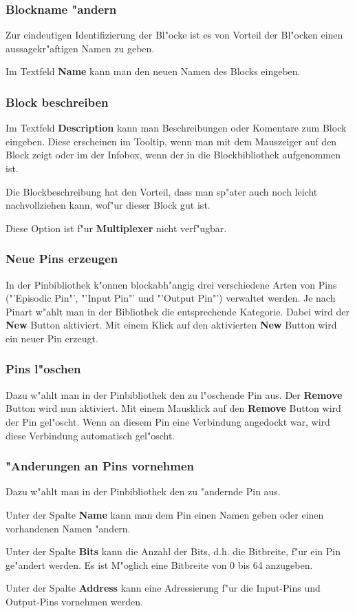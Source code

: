\documentclass[a4paper,titlepage,12pt,ngerman]{scrbook}
\begin{document}
\subsubsection{Blockname "andern}
Zur eindeutigen Identifizierung der Bl"ocke ist es von Vorteil der Bl"ocken einen aussagekr"aftigen Namen zu geben.\par
Im Textfeld {\bf Name} kann man den neuen Namen des Blocks eingeben.
\subsubsection{Block beschreiben}
Im Textfeld {\bf Description} kann man Beschreibungen oder Komentare zum Block eingeben. Diese erscheinen im Tooltip, wenn man mit dem Mauszeiger auf den Block zeigt oder im der Infobox, wenn der in die Blockbibliothek aufgenommen ist.\par
Die Blockbeschreibung hat den Vorteil, dass man sp"ater auch noch leicht nachvollziehen kann, wof"ur dieser Block gut ist.\par
Diese Option ist f"ur {\bf Multiplexer} nicht verf"ugbar.
\subsubsection{Neue Pins erzeugen}
In der Pinbibliothek k"onnen blockabh"angig drei verschiedene Arten von Pins ("'Episodic Pin"', "'Input Pin"' und "'Output Pin"') verwaltet werden. Je nach Pinart w"ahlt man in der Bibliothek die entsprechende Kategorie. Dabei wird der {\bf New} Button aktiviert. Mit einem Klick auf den aktivierten {\bf New} Button wird ein neuer Pin erzeugt. \par
\subsubsection{Pins l"oschen}
Dazu w"ahlt man in der Pinbibliothek den zu l"oschende Pin aus. Der {\bf Remove} Button wird nun aktiviert. Mit einem Mausklick auf den {\bf Remove} Button wird der Pin gel"oscht. Wenn an diesem Pin eine Verbindung angedockt war, wird diese Verbindung automatisch gel"oscht.
\subsubsection{"Anderungen an Pins vornehmen}
Dazu w"ahlt man in der Pinbibliothek den zu "andernde Pin aus.\par
Unter der Spalte {\bf Name} kann man dem Pin einen Namen geben oder einen vorhandenen Namen "andern.\par
Unter der Spalte {\bf Bits} kann die Anzahl der Bits, d.h. die Bitbreite, f"ur ein Pin ge"andert werden. Es ist M"oglich eine Bitbreite von 0 bis 64 anzugeben.\par
Unter der Spalte {\bf Address} kann eine Adressierung f"ur die Input-Pins und Output-Pins vornehmen werden.\par
\end{document}
